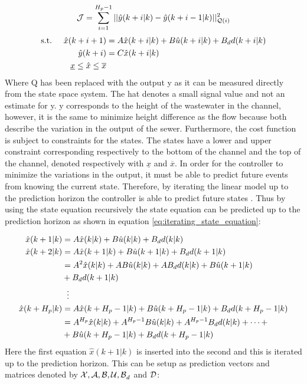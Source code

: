 \begin{equation}\label{eq:cost_function_height}
	 \CMcal{J} = \sum_{i=1}^{H_p-1} || \hat{y}(k+i|k)-\hat{y}(k+i-1|k)||_{\CMcal{Q}(i)}^2
\end{equation}
\begin{equation}
	\begin{aligned}
	\text{s.t.} \hspace{5mm}  \hat{x}(k+i+1) &= A\hat{x}(k+i|k)+B\hat{u}(k+i|k)+B_dd(k+i|k) \\
						      \hat{y}(k+i)&= C\hat{x}(k+i|k) \\
						     \underline{x} \leq \hat{x} \leq \overline{x}
	\end{aligned}
\end{equation}
Where Q has been replaced with the output y as it can be measured directly from the state space system. The hat denotes a small signal value and not an estimate for y. y corresponds to the height of the wastewater in the channel, however, it is the same to minimize height difference as the flow because both describe the variation in the output of the sewer. Furthermore, the cost function is subject to constraints for the states. The states have a lower and upper constraint corresponding respectively to the bottom of the channel and the top of the channel, denoted respectively with $\underline{x}$ and $\overline{x}$. In order for the controller to minimize the variations in the output, it must be able to predict future events from knowing the current state. Therefore, by iterating the linear model up to the prediction horizon the controller is able to predict future states \cite{maciejowski2002predictive}. Thus by using the state equation recursively the state equation can be predicted up to the prediction horizon as shown in equation \ref{eq:iterating_state_equation}: 

\begin{equation}\label{eq:iterating_state_equation}
\begin{aligned}
	\hat{x}(k+1|k) &= A\hat{x}(k|k)+B\hat{u}(k|k) + B_dd(k|k)\\
	\hat{x}(k+2|k) &= A\hat{x}(k+1|k)+B\hat{u}(k+1|k)+ B_dd(k+1|k) \\
				   &= A^2\hat{x}(k|k)+AB\hat{u}(k|k)+AB_dd(k|k) + B\hat{u}(k+1|k) \\
				   &+ B_dd(k+1|k) \\
				   &\hspace{2mm}\vdots\\
   \hat{x}(k+H_p|k)&= A\hat{x}(k+H_p-1|k)+B\hat{u}(k+H_p-1|k)+B_dd(k+H_p-1|k)\\
   				   &= A^{H_p}\hat{x}(k|k)+A^{H_p-1}B\hat{u}(k|k)+A^{H_p-1}B_dd(k|k)+\cdots+\\
   				   &+B\hat{u}(k+H_p-1|k)+B_dd(k+H_p-1|k)
\end{aligned}
\end{equation}
Here the first equation $\hat{x}(k+1|k)$ is inserted into the second and this is iterated up to the prediction horizon. This can be setup as prediction vectors and matrices denoted by $\CMcal{X,A,B,U,B}_d$ and $\CMcal{D}$:


